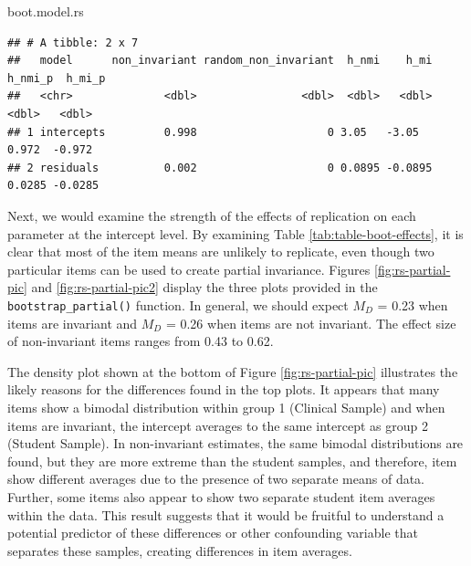 \documentclass[
  man]{apa7}
\newenvironment{Shaded}{\begin{snugshade}}{\end{snugshade}}
\newcommand{\NormalTok}[1]{#1}
\begin{document}
\normalsize

\normalsize

\begin{Shaded}
\begin{Highlighting}[]
\NormalTok{boot.model.rs}
\end{Highlighting}
\end{Shaded}

\normalsize

\begin{verbatim}
## # A tibble: 2 x 7
##   model      non_invariant random_non_invariant  h_nmi    h_mi h_nmi_p  h_mi_p
##   <chr>              <dbl>                <dbl>  <dbl>   <dbl>   <dbl>   <dbl>
## 1 intercepts         0.998                    0 3.05   -3.05    0.972  -0.972 
## 2 residuals          0.002                    0 0.0895 -0.0895  0.0285 -0.0285
\end{verbatim}

Next, we would examine the strength of the effects of replication on each parameter at the intercept level. By examining Table \ref{tab:table-boot-effects}, it is clear that most of the item means are unlikely to replicate, even though two particular items can be used to create partial invariance. Figures \ref{fig:rs-partial-pic} and \ref{fig:rs-partial-pic2} display the three plots provided in the \texttt{bootstrap\_partial()} function. In general, we should expect \(M_{D}\) = 0.23 when items are invariant and \(M_{D}\) = 0.26 when items are not invariant. The effect size of non-invariant items ranges from 0.43 to 0.62.

The density plot shown at the bottom of Figure \ref{fig:rs-partial-pic} illustrates the likely reasons for the differences found in the top plots. It appears that many items show a bimodal distribution within group 1 (Clinical Sample) and when items are invariant, the intercept averages to the same intercept as group 2 (Student Sample). In non-invariant estimates, the same bimodal distributions are found, but they are more extreme than the student samples, and therefore, item show different averages due to the presence of two separate means of data. Further, some items also appear to show two separate student item averages within the data. This result suggests that it would be fruitful to understand a potential predictor of these differences or other confounding variable that separates these samples, creating differences in item averages.
\end{document}
